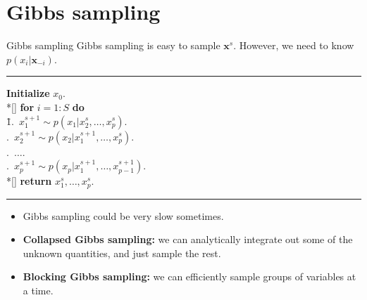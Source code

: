 \documentclass[10pt,mathserif]{beamer}
\begin{document}
\section{{Gibbs sampling}}
\begin{frame}{Gibbs sampling}
Gibbs sampling is easy to sample $\bm{x}^s$. However, we need to know $p(x_i|\bm{x}_{-i})$.
\noindent\rule[-5pt]{\textwidth}{0.4pt}
{\footnotesize
\begin{tabbing}
    {\bf Initialize} $x_0$. \\*[\smallskipamount]
    {\bf for} $i=1:S$ {\bf do}\\
    \qquad \= 1.\ $x_1^{s+1} \sim p(x_1|x_2^{s},\ldots,x_p^{s})$. \\
    .\ $x_2^{s+1} \sim p(x_2|x_1^{s+1},\ldots,x_p^{s})$. \\
    .\ $\ldots$. \\
    .\ $x_p^{s+1} \sim p(x_p|x_1^{s+1},\ldots,x_{p-1}^{s+1})$. \\*[\smallskipamount]
    {\bf return} $x_1^s,\ldots,x_p^s$.
\end{tabbing}}
\noindent\rule[10pt]{\textwidth}{0.4pt}

\begin{itemize}
    \item Gibbs sampling could be very slow sometimes.
    \item \textbf{Collapsed Gibbs sampling:} we can analytically integrate out some of the unknown quantities, and just sample the rest.
    \item \textbf{Blocking Gibbs sampling:} we can efficiently sample groups of variables at a time.
\end{itemize}
\end{frame}
\end{document}
